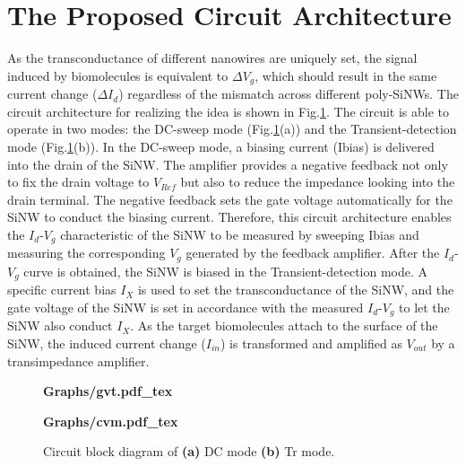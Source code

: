 \documentclass{article}
\begin{document}
\section{The Proposed Circuit Architecture}
As the transconductance of different nanowires are uniquely set,
the signal induced by biomolecules is equivalent to $\Delta V_g$,
which should result in the same current change ($\Delta I_{d}$) regardless
of the mismatch across different poly-SiNWs.
The circuit architecture for realizing the idea is shown in Fig.\ref{fig:mode}.
The circuit is able to operate in two modes:
the DC-sweep mode (Fig.\ref{fig:mode}(a)) and the Transient-detection mode (Fig.\ref{fig:mode}(b)).
In the DC-sweep mode, a biasing current (Ibias) is delivered into the drain of the SiNW.
The amplifier provides a negative feedback not only to fix the drain voltage to $V_{Ref}$
but also to reduce the impedance looking into the drain terminal.
The negative feedback sets the gate voltage automatically for the SiNW to conduct the biasing current.
Therefore, this circuit architecture enables the $I_d$-$V_g$ characteristic
of the SiNW to be measured by sweeping Ibias and measuring the corresponding $V_g$ generated by the feedback amplifier.
After the $I_d$-$V_g$ curve is obtained, the SiNW is biased in the Transient-detection mode.
A specific current bias $I_X$ is used to set the transconductance of the SiNW,
and the gate voltage of the SiNW is set in accordance with the measured $I_d$-$V_g$
to let the SiNW also conduct $I_X$.
As the target biomolecules attach to the surface of the SiNW,
the induced current change ($I_{in}$) is transformed and amplified as $V_{out}$ by a transimpedance amplifier.
%
\begin{figure}[!tb]

    \begin{minipage}[htb][3cm][t]{0.18\linewidth}
        \textbf{
        \centering
        \def\svgwidth{2.62cm}
        \fontsize{6}{15}\selectfont
         {Graphs/gvt.pdf_tex}
        }
    \end{minipage}
    \hfill
    \begin{minipage}[htb][3cm][t]{0.65\linewidth}
        \textbf{
        \centering
        \def\svgwidth{4.3cm}
        \fontsize{6}{15}\selectfont
         {Graphs/cvm.pdf_tex}
        }
    \end{minipage}
    \vfill
    \makebox[1\linewidth][l]{}
    \caption{Circuit block diagram of \textbf{(a)} DC mode \textbf{(b)} Tr mode.}
    \label{fig:mode}
\end{figure}
%
\end{document}
